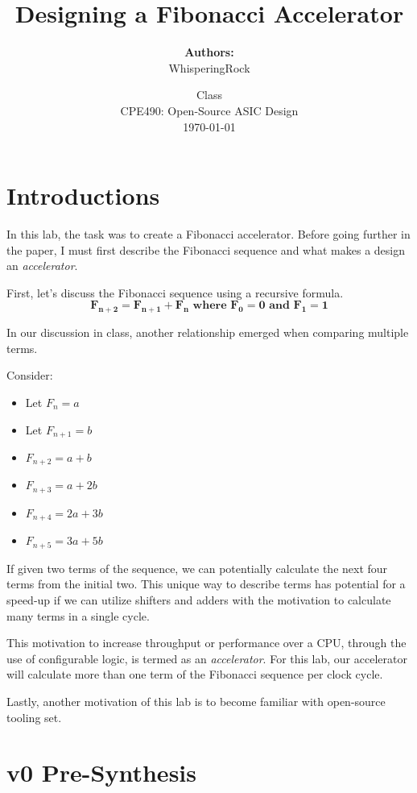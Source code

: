\documentclass[a4paper]{report}
\title{\Huge{Designing a Fibonacci Accelerator}}
\author{\textbf{Authors:} \\WhisperingRock}
\date{Class\\CPE490: Open-Source ASIC Design\\\today}
\begin{document}
    \maketitle
	

	\tableofcontents

	\chapter{Introductions}
		In this lab, the task was to create a Fibonacci accelerator. Before
		going further in the paper, I must first describe the Fibonacci 
		sequence and what makes a design an \textit{accelerator}. 

		First, let's discuss the Fibonacci sequence using a recursive formula. 
		\[
			\bm{F_{n+2} = F_{n+1} + F_{n} \text{ where } F_0 = 0 \text{ and } F_1 = 1}
		\]

		In our discussion in class, another relationship emerged when comparing multiple terms.

		Consider:
		\begin{itemize}
			\item Let $F_{n} = a$ 
			\item Let $F_{n+1} = b$ 
			\item $F_{n+2} = a + b$
			\item $F_{n+3} = a + 2b$
			\item $F_{n+4} = 2a + 3b$
			\item $F_{n+5} = 3a + 5b$
		\end{itemize}

		If given two terms of the sequence, we can potentially calculate
		the next four terms from the initial two. This unique way to describe terms 
		has potential for a speed-up if we can utilize shifters and adders
		with the motivation to calculate many terms in a single cycle. 

		This motivation to increase throughput or performance over a CPU, 
		through the use of configurable logic, is termed as an \textit{accelerator}. 
		For this lab, our accelerator will calculate more than one term
		of the Fibonacci sequence per clock cycle. 

		Lastly, another motivation of this lab is to become familiar with 
		open-source tooling set. 

	\chapter{v0 Pre-Synthesis}
\end{document}
